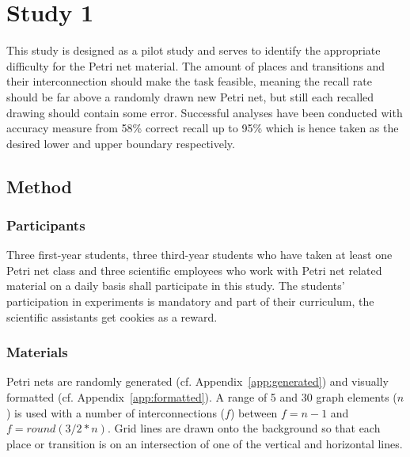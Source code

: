 \section{Study 1}

This study is designed as a pilot study and serves to identify the appropriate difficulty for the Petri net material.
The amount of places and transitions and their interconnection should make the task feasible, meaning the recall rate should be far above a randomly drawn new Petri net, but still each recalled drawing should contain some error.
Successful analyses have been conducted with accuracy measure from 58\% correct recall \cite{egan1979chunking} up to 95\% \cite{moss2006role} which is hence taken as the desired lower and upper boundary respectively.

\subsection{Method}

\subsubsection{Participants}
Three first-year students, three third-year students who have taken at least one Petri net class and three scientific employees who work with Petri net related material on a daily basis shall participate in this study.
The students' participation in experiments is mandatory and part of their curriculum, the scientific assistants get cookies as a reward.

\subsubsection{Materials}
Petri nets are randomly generated (cf. Appendix~\ref{app:generated}) and visually formatted (cf. Appendix~\ref{app:formatted}).
A range of 5 and 30 graph elements ($n$) is used with a number of interconnections ($f$) between $f=n-1$ and $f=round(3/2 * n)$.
Grid lines are drawn onto the background so that each place or transition is on an intersection of one of the vertical and horizontal lines.

